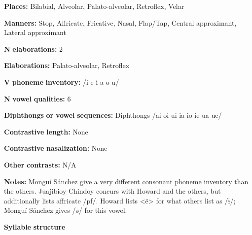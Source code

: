 \begin{styleBody}
\textbf{Places:} Bilabial, Alveolar, Palato-alveolar, Retroflex, Velar
\end{styleBody}

\begin{styleBody}
\textbf{Manners:} Stop, Affricate, Fricative, Nasal, Flap/Tap, Central approximant, Lateral approximant
\end{styleBody}

\begin{styleBody}
\textbf{N} \textbf{elaborations:} 2
\end{styleBody}

\begin{styleBody}
\textbf{Elaborations:} Palato-alveolar, Retroflex
\end{styleBody}

\begin{styleBody}
\textbf{V} \textbf{phoneme} \textbf{inventory:} /i e ɨ a o u/
\end{styleBody}

\begin{styleBody}
\textbf{N} \textbf{vowel} \textbf{qualities:} 6
\end{styleBody}

\begin{styleBody}
\textbf{Diphthongs} \textbf{or} \textbf{vowel} \textbf{sequences:} Diphthongs /ai oi ui ia io ie ua ue/
\end{styleBody}

\begin{styleBody}
\textbf{Contrastive} \textbf{length:} None
\end{styleBody}

\begin{styleBody}
\textbf{Contrastive} \textbf{nasalization:} None
\end{styleBody}

\begin{styleBody}
\textbf{Other} \textbf{contrasts:} N/A
\end{styleBody}

\begin{styleBody}
\textbf{Notes:} Monguí Sánchez give a very different consonant phoneme inventory than the others. Juajibioy Chindoy concurs with Howard and the others, but additionally lists affricate /pf/. Howard lists <ë> for what others list as /ɨ/; Monguí Sánchez gives /ə/ for this vowel.
\end{styleBody}

\begin{styleBody}
\textbf{Syllable} \textbf{structure}
\end{styleBody}

